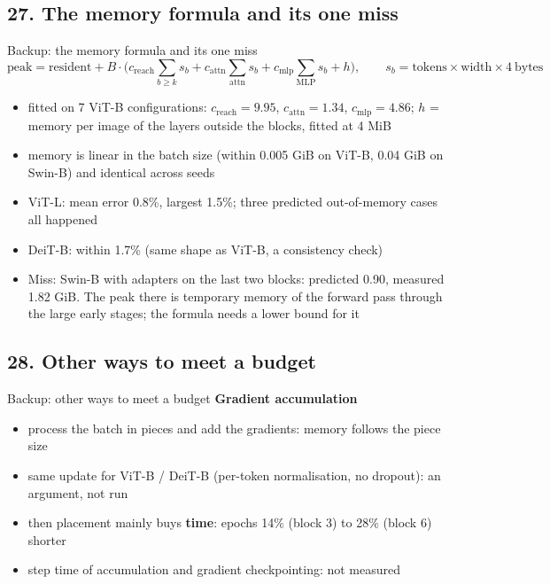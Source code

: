 \documentclass[aspectratio=169,11pt]{beamer}
\begin{document}
\subsection{27. The memory formula and its one miss}
\begin{frame}{Backup: the memory formula and its one miss}
\small
\[
\text{peak} = \text{resident} + B\cdot\Big(c_\text{reach}\!\sum_{b\ge k}\! s_b + c_\text{attn}\!\!\sum_{\text{attn}}\! s_b + c_\text{mlp}\!\!\sum_{\text{MLP}}\! s_b + h\Big),\qquad s_b = \text{tokens}\times\text{width}\times 4\ \text{bytes}
\]
\begin{itemize}
  \item fitted on 7 ViT-B configurations: $c_\text{reach}=9.95$, $c_\text{attn}=1.34$, $c_\text{mlp}=4.86$; $h$ = memory per image of the layers outside the blocks, fitted at 4 MiB
  \item memory is linear in the batch size (within 0.005 GiB on ViT-B, 0.04 GiB on Swin-B) and identical across seeds
  \item ViT-L: mean error 0.8\%, largest 1.5\%; three predicted out-of-memory cases all happened
  \item DeiT-B: within 1.7\% (same shape as ViT-B, a consistency check)
  \item \alert{Miss}: Swin-B with adapters on the last two blocks: predicted 0.90, measured 1.82 GiB. The peak there is temporary memory of the forward pass through the large early stages; the formula needs a lower bound for it
\end{itemize}
\end{frame}

\subsection{28. Other ways to meet a budget}
\begin{frame}{Backup: other ways to meet a budget}
\small
\textbf{Gradient accumulation}
\begin{itemize}
  \item process the batch in pieces and add the gradients: memory follows the piece size
  \item same update for ViT-B / DeiT-B (per-token normalisation, no dropout): an argument, not run
  \item then placement mainly buys \textbf{time}: epochs 14\% (block 3) to 28\% (block 6) shorter
  \item step time of accumulation and gradient checkpointing: not measured
\end{itemize}
\end{frame}
\end{document}
